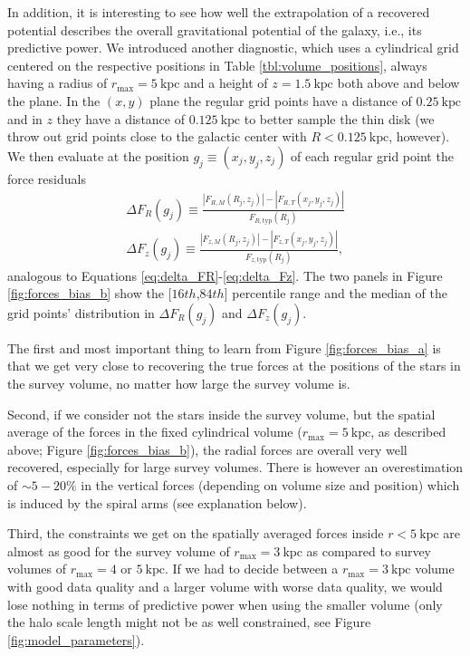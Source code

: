 \documentclass[iop,revtex4,numberedappendix,appendixfloats]{emulateapj}
\begin{document}
In addition, it is interesting to see how well the extrapolation of a recovered potential describes the overall gravitational potential of the galaxy, i.e., its predictive power. We introduced another diagnostic, which uses a cylindrical grid centered on the respective positions in Table \ref{tbl:volume_positions}, always having a radius of $r_\text{max}=5~\text{kpc}$ and a height of $z=1.5~\text{kpc}$ both above and below the plane.  In the $(x,y)$ plane the regular grid points have a distance of $0.25~\text{kpc}$ and in $z$ they have a distance of  $0.125~\text{kpc}$ to better sample the thin disk (we throw out grid points close to the galactic center with $R<0.125~\text{kpc}$, however). We then evaluate at the position $g_j \equiv (x_j,y_j,z_j)$ of each regular grid point the force residuals
\begin{eqnarray}
\Delta F_R(g_j) \equiv \frac{|F_{R,M}(R_j,z_j)| - |F_{R,T}(x_j,y_j,z_j)|}{F_{R,\text{typ}}(R_j)} \label{eq:delta_FR_grid}\\
\Delta F_z(g_j) \equiv \frac{|F_{z,M}(R_j,z_j)| - |F_{z,T}(x_j,y_j,z_j)|}{F_{z,\text{typ}}(R_j)},\label{eq:delta_Fz_grid}
\end{eqnarray}
analogous to Equations \eqref{eq:delta_FR}-\eqref{eq:delta_Fz}. The two panels in Figure \ref{fig:forces_bias_b} show the [$16th$,$84th$] percentile range and the median of the grid points' distribution in $\Delta F_R(g_j)$ and $\Delta F_z(g_j)$.

The first and most important thing to learn from Figure \ref{fig:forces_bias_a} is that we get very close to recovering the true forces at the positions of the stars in the survey volume, no matter how large the survey volume is.

Second, if we consider not the stars inside the survey volume, but the spatial average of the forces in the fixed cylindrical volume ($r_\text{max}=5~\text{kpc}$, as described above; Figure \ref{fig:forces_bias_b}), the radial forces are overall very well recovered, especially for large survey volumes. There is however an overestimation of $\sim5-20\%$ in the vertical forces (depending on volume size and position) which is induced by the spiral arms (see explanation below).

Third, the constraints we get on the spatially averaged forces inside $r<5~\text{kpc}$ are almost as good for the survey volume of $r_\text{max}=3~\text{kpc}$ as compared to survey volumes of $r_\text{max}=4$ or $5~\text{kpc}$. If we had to decide between a $r_\text{max}=3~\text{kpc}$ volume with good data quality and a larger volume with worse data quality, we would lose nothing in terms of predictive power when using the smaller volume (only the halo scale length might not be as well constrained, see Figure \ref{fig:model_parameters}).
\end{document}
